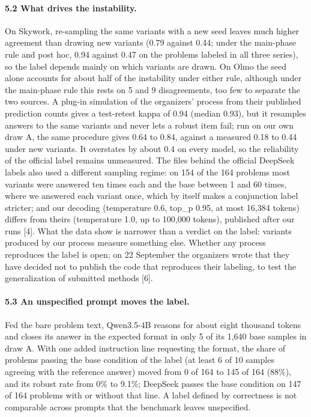 \paragraph{5.2 What drives the instability.}
On Skywork, re-sampling the same variants with a new seed leaves much higher agreement than drawing new variants (0.79 against 0.44; under the main-phase rule and post hoc, 0.94 against 0.47 on the problems labeled in all three series), so the label depends mainly on which variants are drawn. On Olmo the seed alone accounts for about half of the instability under either rule, although under the main-phase rule this rests on 5 and 9 disagreements, too few to separate the two sources. A plug-in simulation of the organizers' process from their published prediction counts gives a test-retest kappa of 0.94 (median 0.93), but it resamples answers to the same variants and never lets a robust item fail; run on our own draw A, the same procedure gives 0.64 to 0.84, against a measured 0.18 to 0.44 under new variants. It overstates by about 0.4 on every model, so the reliability of the official label remains unmeasured. The files behind the official DeepSeek labels also used a different sampling regime: on 154 of the 164 problems most variants were answered ten times each and the base between 1 and 60 times, where we answered each variant once, which by itself makes a conjunction label stricter; and our decoding (temperature 0.6, top\_p 0.95, at most 16,384 tokens) differs from theirs (temperature 1.0, up to 100,000 tokens), published after our runs [4]. What the data show is narrower than a verdict on the label: variants produced by our process measure something else. Whether any process reproduces the label is open; on 22 September the organizers wrote that they have decided not to publish the code that reproduces their labeling, to test the generalization of submitted methods [6].

\paragraph{5.3 An unspecified prompt moves the label.}
Fed the bare problem text, Qwen3.5-4B reasons for about eight thousand tokens and closes its answer in the expected format in only 5 of its 1,640 base samples in draw A. With one added instruction line requesting the format, the share of problems passing the base condition of the label (at least 6 of 10 samples agreeing with the reference answer) moved from 0 of 164 to 145 of 164 (88\%), and its robust rate from 0\% to 9.1\%; DeepSeek passes the base condition on 147 of 164 problems with or without that line. A label defined by correctness is not comparable across prompts that the benchmark leaves unspecified.

